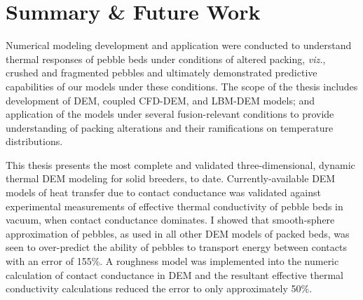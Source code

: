 \chapter{Summary \& Future Work}\label{sec:summary}

Numerical modeling development and application were conducted to understand thermal responses of pebble beds under conditions of altered packing, \textit{viz.}, crushed and fragmented pebbles and ultimately demonstrated predictive capabilities of our models under these conditions. The scope of the thesis includes development of DEM, coupled CFD-DEM, and LBM-DEM models; and application of the models under several fusion-relevant conditions to provide understanding of packing alterations and their ramifications on temperature distributions.


This thesis presents the most complete and validated three-dimensional, dynamic thermal DEM modeling for solid breeders, to date. Currently-available DEM models of heat transfer due to contact conductance was validated against experimental measurements of effective thermal conductivity of pebble beds in vacuum, when contact conductance dominates. I showed that smooth-sphere approximation of pebbles, as used in all other DEM models of packed beds, was seen to over-predict the ability of pebbles to transport energy between contacts with an error of 155\%. A roughness model was implemented into the numeric calculation of contact conductance in DEM and the resultant effective thermal conductivity calculations reduced the error to only approximately 50\%. 

